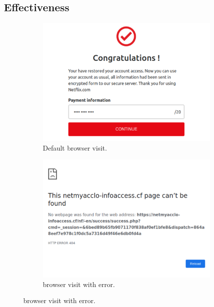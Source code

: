 \subsection{Effectiveness}
\label{ss:effectiveness}

\begin{figure}
\centering
	\begin{subfigure}[tb]{.31\textwidth}
		\includegraphics[width=\linewidth]{figs/netflix_n.pdf}
        \caption{Default browser visit.}
        \label{fig:normal}
	\end{subfigure}%
	\quad
	\begin{subfigure}[tb]{.31\textwidth}
		\includegraphics[width=\linewidth]{figs/netflix_sp.pdf}
        \caption{\spartacus browser visit with error.}
        \label{fig:sp1}
	\end{subfigure}%

\end{figure}
